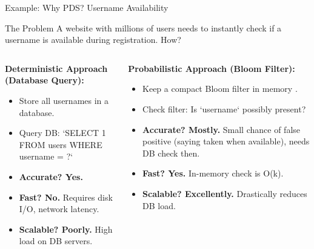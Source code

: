 \begin{frame}{Example: Why PDS? Username Availability}
  \begin{block}{The Problem}
    A website with millions of users needs to instantly check if a username is available during registration. How? \parencite{10.1145/362686.362692}
  \end{block}

  \begin{columns}
    \begin{column}{0.5\textwidth}
      \textbf{Deterministic Approach (Database Query):}
      \begin{itemize}
        \item Store all usernames in a database.
        \item Query DB: `SELECT 1 FROM users WHERE username = ?`
        \item \textbf{Accurate? Yes.}
        \item \textbf{Fast? No.} Requires disk I/O, network latency.
        \item \textbf{Scalable? Poorly.} High load on DB servers.
      \end{itemize}
    \end{column}
    \begin{column}{0.5\textwidth}
      \textbf{Probabilistic Approach (Bloom Filter):}
      \begin{itemize}
        \item Keep a compact Bloom filter in memory \parencite{10.1145/362686.362692}.
        \item Check filter: Is `username` possibly present?
        \item \textbf{Accurate? Mostly.} Small chance of false positive (saying taken when available), needs DB check then.
        \item \textbf{Fast? Yes.} In-memory check is O(k).
        \item \textbf{Scalable? Excellently.} Drastically reduces DB load.
      \end{itemize}
    \end{column}
  \end{columns}
\end{frame}


